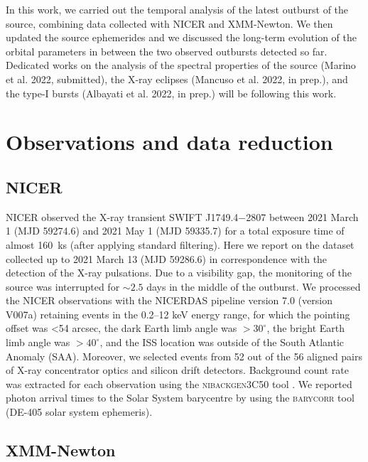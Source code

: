 \documentclass[fleqn,usenatbib]{mnras}
\newcommand{\swiftj}{SWIFT J1749.4$-$2807}
\newcommand{\nicer}{NICER}
\newcommand{\xmm}{XMM-Newton}
\begin{document}
In this work, we carried out the temporal analysis of the latest outburst of the source, combining data collected with \nicer{} and \xmm{}. We then updated the source ephemerides and we discussed the long-term evolution of the orbital parameters in between the two observed outbursts detected so far. Dedicated works on the analysis of the spectral properties of the source (Marino et al. 2022, submitted), the X-ray eclipses (Mancuso et al. 2022, in prep.), and the type-I bursts (Albayati et al. 2022, in prep.) will be following this work.

\section{Observations and data reduction}


\subsection{NICER}

NICER \citep{Gendreau:2012vf} observed the X-ray transient \swiftj{} between 2021 March 1 (MJD 59274.6) and 2021 May 1 (MJD 59335.7) for a total exposure time of almost 160~ks (after applying standard filtering). Here we report on the dataset collected up to 2021 March 13 (MJD 59286.6) in correspondence with the detection of the X-ray pulsations. Due to a visibility gap, the monitoring of the source was interrupted for $\sim2.5$ days in the middle of the outburst. We processed the NICER observations with the \textsc{NICERDAS} pipeline version 7.0 (version V007a) retaining events in the 0.2--12 keV energy range, for which the pointing offset was <54 arcsec, the dark Earth limb angle was $>30^\circ$, the bright Earth limb angle was $>40^\circ$, and the ISS location was outside of the South Atlantic Anomaly (SAA). Moreover, we selected events from 52 out of the 56 aligned pairs of X-ray concentrator optics and silicon drift detectors. Background count rate was extracted for each observation using the \textsc{nibackgen3C50} tool \citep{Remillard:2021tt}. We reported photon arrival times to the Solar System barycentre by using the \textsc{barycorr} tool (DE-405 solar system ephemeris).   


\subsection{XMM-Newton}
\end{document}
